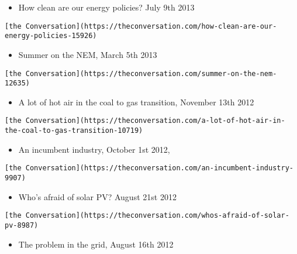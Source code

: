 \documentclass[
]{article}
\providecommand{\tightlist}{%
  \setlength{\itemsep}{0pt}\setlength{\parskip}{0pt}}
\begin{document}
\begin{itemize}
\tightlist
\item
  How clean are our energy policies? July 9th 2013
\end{itemize}

\begin{verbatim}
[the Conversation](https://theconversation.com/how-clean-are-our-energy-policies-15926)
\end{verbatim}

\begin{itemize}
\tightlist
\item
  Summer on the NEM, March 5th 2013
\end{itemize}

\begin{verbatim}
[the Conversation](https://theconversation.com/summer-on-the-nem-12635)
\end{verbatim}

\begin{itemize}
\tightlist
\item
  A lot of hot air in the coal to gas transition, November 13th 2012
\end{itemize}

\begin{verbatim}
[the Conversation](https://theconversation.com/a-lot-of-hot-air-in-the-coal-to-gas-transition-10719)
\end{verbatim}

\begin{itemize}
\tightlist
\item
  An incumbent industry, October 1st 2012,
\end{itemize}

\begin{verbatim}
[the Conversation](https://theconversation.com/an-incumbent-industry-9907)
\end{verbatim}

\begin{itemize}
\tightlist
\item
  Who's afraid of solar PV? August 21st 2012
\end{itemize}

\begin{verbatim}
[the Conversation](https://theconversation.com/whos-afraid-of-solar-pv-8987)
\end{verbatim}

\begin{itemize}
\tightlist
\item
  The problem in the grid, August 16th 2012
\end{itemize}
\end{document}
